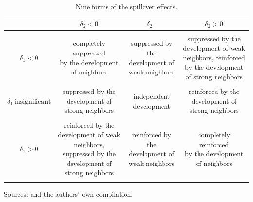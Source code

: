 \documentclass[11pt,a4paper]{amsart}
\theoremstyle{plain}
\theoremstyle{definition}
\begin{document}
\begin{singlespace}
	\begin{table}[H] 
		\caption{Nine forms of the spillover effects.}\label{tb:9cptb}
		\begin{threeparttable}
			\begin{center}
				\begin{NiceTabular*}{\linewidth}{@{\extracolsep{\fill}}cccc}
					\hline
					& $\delta_{2} < 0$ & $\delta_{2}$~  & $\delta_{2} > 0$ \\ 		
					\hline 
					&&&\\
					\parbox{2cm}{$\delta_{1} < 0$} & \parbox{4cm}{completely suppressed \\by the development of neighbors} & \parbox{4cm}{suppressed by the development of weak neighbors} &  \parbox{4cm}{suppressed by the development of weak neighbors, reinforced by the development of strong neighbors} \\
					&&&\\
					\parbox{2cm}{$\delta_{1} ~\text{insignificant}$} & \parbox{4cm}{suppressed by the development of strong neighbors}	 &   \parbox{4cm}{independent \\development}  &  \parbox{4cm}{reinforced by the development of strong neighbors}   \\
					&&&\\
					\parbox{2cm}{$\delta_{1} > 0$}	&  \parbox{4cm}{reinforced by the development of weak neighbors, suppressed by the development of strong neighbors}	&  \parbox{4cm}{reinforced by the development of weak neighbors}	  & \parbox{4cm}{completely reinforced \\ by the development of neighbors}	 \\
					&&&\\
					\hline
				\end{NiceTabular*}
			\end{center}
			\begin{tablenotes}
				\item Sources: \textcite{diaoSpatialSpilloverEffect2021} and the authors’ own compilation.
			\end{tablenotes}
		\end{threeparttable}
	\end{table}
\end{singlespace}
\end{document}
